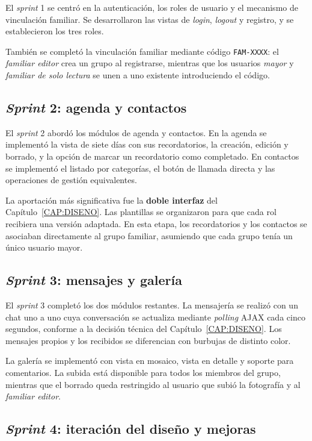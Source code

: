 El \emph{sprint} 1 se centró en la autenticación, los roles de usuario y
el mecanismo de vinculación familiar. Se desarrollaron las vistas de
\emph{login}, \emph{logout} y registro, y se establecieron los tres
roles.

También se completó la vinculación familiar mediante código
\texttt{FAM-XXXX}: el \emph{familiar editor} crea un grupo al registrarse,
mientras que los usuarios \emph{mayor} y \emph{familiar de solo lectura} se
unen a uno existente introduciendo el código.

\subsection{\emph{Sprint} 2: agenda y
contactos\label{SUB:SPRINT_2}}

El \emph{sprint} 2 abordó los módulos de agenda y contactos. En la agenda
se implementó la vista de siete días con sus recordatorios, la creación,
edición y borrado, y la opción de marcar un recordatorio como completado.
En contactos se implementó el listado por categorías, el botón de llamada
directa y las operaciones de gestión equivalentes.

La aportación más significativa fue la \textbf{doble interfaz} del
Capítulo~\ref{CAP:DISENO}. Las plantillas se organizaron para que cada
rol recibiera una versión adaptada. En esta etapa, los recordatorios y los contactos se
asociaban directamente al grupo familiar, asumiendo que cada grupo tenía
un único usuario mayor.

\subsection{\emph{Sprint} 3: mensajes y
galería\label{SUB:SPRINT_3}}

El \emph{sprint} 3 completó los dos módulos restantes. La mensajería se
realizó con un chat uno a uno cuya conversación se actualiza mediante
\emph{polling} AJAX cada cinco segundos, conforme a la decisión técnica
del Capítulo~\ref{CAP:DISENO}. Los mensajes propios y los recibidos se
diferencian con burbujas de distinto color.

La galería se implementó con vista en mosaico, vista en detalle y soporte
para comentarios. La subida está disponible para todos los miembros del
grupo, mientras que el borrado queda restringido al usuario que subió la
fotografía y al \emph{familiar editor}.

\subsection{\emph{Sprint} 4: iteración del diseño y
mejoras\label{SUB:SPRINT_4}}

